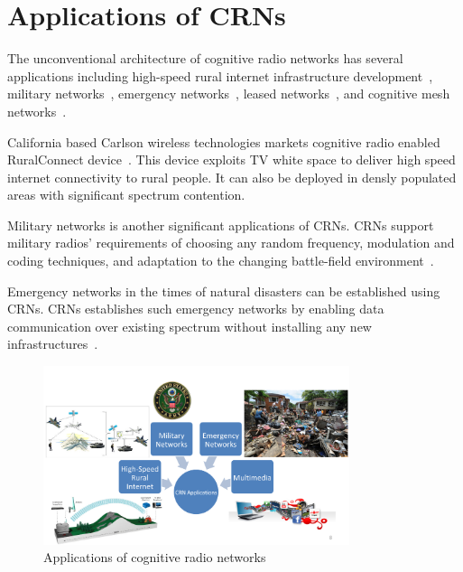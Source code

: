 \section{Applications of CRNs}
The unconventional architecture of cognitive radio networks has several applications including high-speed rural internet infrastructure development~\cite{fitch2011wireless}, military networks~\cite{murty2003software}, emergency networks~\cite{maldonado2005cognitive}, leased networks~\cite{stine2005spectrum}, and cognitive mesh networks~\cite{berlemann2005policy}.

California based Carlson wireless technologies markets cognitive radio enabled RuralConnect device~\cite{ruralConnect}. This device exploits TV white space to deliver high speed internet connectivity to rural people. It can also be deployed in densly populated areas with significant spectrum contention.

Military networks is another significant applications of CRNs. CRNs support military radios' requirements of choosing any random frequency, modulation and coding techniques, and adaptation to the changing battle-field environment~\cite{akyildiz2006next}.

Emergency networks in the times of natural disasters can be established using CRNs. CRNs establishes such emergency networks by enabling data communication over existing spectrum without installing any new infrastructures~\cite{maldonado2005cognitive}.

\begin{figure}[!htbp]
    \begin{center}
        \includegraphics[width=0.8\textwidth]{myFigures/CRNApplications.png}
        \caption{Applications of cognitive radio networks~\cite{akyildiz2006next}}
        \label{fig:CRNApplications}
    \end{center}
\end{figure}

